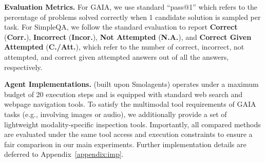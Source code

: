 \noindent\textbf{Evaluation Metrics.} For GAIA, we use standard ``pass@1'' which refers to the percentage of problems solved correctly when 1 candidate solution is sampled per task. For SimpleQA, we follow the standard evaluation to report \textbf{Correct} (\textbf{Corr.}), \textbf{Incorrect} (\textbf{Incor.}), \textbf{Not Attempted} (\textbf{N.A.}), and \textbf{Correct Given Attempted} (\textbf{C./Att.}), which refer to the number of correct, incorrect, not attempted, and correct given attempted answers out of all the answers, respectively.

\noindent\textbf{Agent Implementations.} \method (built upon Smolagents) operates under a maximum budget of 20 execution steps and is equipped with standard web search and webpage navigation tools. To satisfy the multimodal tool requirements of GAIA tasks (e.g., involving images or audio), we additionally provide a set of lightweight modality-specific inspection tools. 
Importantly, all compared methods are evaluated under the same tool access and execution constraints to ensure a fair comparison in our main experiments. Further implementation details are deferred to Appendix~\ref{appendix:imp}.



